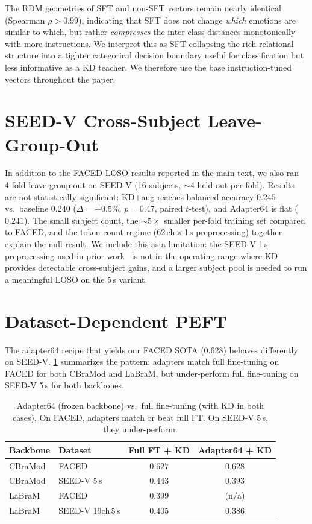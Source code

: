 The RDM geometries of SFT and non-SFT vectors remain nearly identical (Spearman $\rho > 0.99$), indicating that SFT does not change \emph{which} emotions are similar to which, but rather \emph{compresses} the inter-class distances monotonically with more instructions. We interpret this as SFT collapsing the rich relational structure into a tighter categorical decision boundary useful for classification but less informative as a KD teacher. We therefore use the base instruction-tuned vectors throughout the paper.

\section{SEED-V Cross-Subject Leave-Group-Out}
\label{sec:supp_seedv_loso}

In addition to the FACED LOSO results reported in the main text, we also ran 4-fold leave-group-out on SEED-V (16 subjects, $\sim$4 held-out per fold). Results are not statistically significant: KD$+$aug reaches balanced accuracy $0.245$ vs.\ baseline $0.240$ ($\Delta = +0.5\%$, $p = 0.47$, paired $t$-test), and Adapter64 is flat ($0.241$). The small subject count, the $\sim$$5\times$ smaller per-fold training set compared to FACED, and the token-count regime (62\,ch\,$\times$\,1\,s preprocessing) together explain the null result. We include this as a limitation: the SEED-V 1\,s preprocessing used in prior work~\cite{wang2025cbramod} is not in the operating range where KD provides detectable cross-subject gains, and a larger subject pool is needed to run a meaningful LOSO on the 5\,s variant.

\section{Dataset-Dependent PEFT}
\label{sec:supp_peft_dataset}

The adapter$64$ recipe that yields our FACED SOTA ($0.628$) behaves differently on SEED-V. \cref{tab:supp_peft_dataset} summarizes the pattern: adapters match full fine-tuning on FACED for both CBraMod and LaBraM, but under-perform full fine-tuning on SEED-V 5\,s for both backbones.

\begin{table}[!h]
\caption{Adapter64 (frozen backbone) vs.\ full fine-tuning (with KD in both cases). On FACED, adapters match or beat full FT. On SEED-V 5\,s, they under-perform.}
\small
\centering
\begin{tabular}{llcc}
\toprule
Backbone & Dataset & Full FT + KD & Adapter64 + KD \\
\midrule
CBraMod & FACED & $0.627$ & $\mathbf{0.628}$ \\
CBraMod & SEED-V 5\,s & $\mathbf{0.443}$ & $0.393$ \\
LaBraM & FACED & $\mathbf{0.399}$ & (n/a) \\
LaBraM & SEED-V 19ch\,5\,s & $\mathbf{0.405}$ & $0.386$ \\
\bottomrule
\end{tabular}
\label{tab:supp_peft_dataset}
\end{table}

